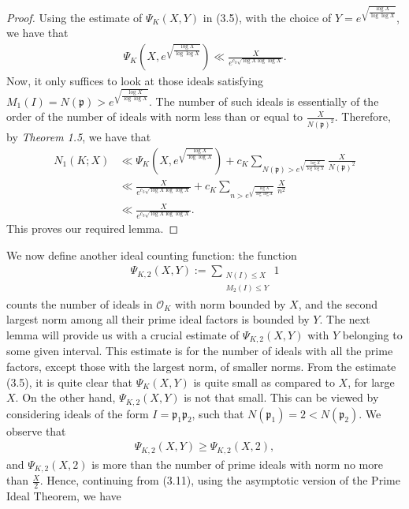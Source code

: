 \documentclass[12pt]{article}
\numberwithin{equation}{section}
\numberwithin{equation}{section}
\begin{document}
\begin{proof}
    Using the estimate of $\Psi_K(X,Y)$ in (3.5), with the choice of $Y = e^{\sqrt{\frac{\log X}{\log\log X}}}$, we have that 
    \begin{align}
        \Psi_K\left(X,e^{\sqrt{\frac{\log X}{\log\log X}}}\right) \ll \frac{X}{e^{c_3\sqrt{\log X\log \log X}}}.
    \end{align}
    Now, it only suffices to look at those ideals satisfying $M_1(I)=N(\mathfrak{p})>e^{\sqrt{\frac{\log X}{\log\log X}}}$. The number of such ideals is essentially of the order of the number of ideals with norm less than or equal to $\frac{X}{N(\mathfrak{p})^2}$. Therefore, by \textit{Theorem 1.5}, we have that 
    \begin{align}
        N_1(K;X) &\ll  \Psi_K\left(X,e^{\sqrt{\frac{\log X}{\log\log X}}}\right) + c_K \sum_{N(\mathfrak{p})>e^{\sqrt{\frac{\log X}{\log\log X}}}}\frac{X}{N(\mathfrak{p})^2} \nonumber \\
        &\ll \frac{X}{e^{c_3\sqrt{\log X\log\log X}}} + c_K\sum_{n>e^{\sqrt{\frac{\log X}{\log\log X}}}} \frac{X}{n^2} \nonumber \\
        &\ll \frac{X}{e^{c_3\sqrt{\log X\log\log X}}}.
    \end{align}
This proves our required lemma.
\end{proof}
\noindent We now define another ideal counting function: the function
\begin{align}
    \Psi_{K,2}(X,Y) := \sum_{\substack{N(I)\leq X \\ M_2(I)\leq Y}} 1 
\end{align}
counts the number of ideals in $\mathcal{O}_K$ with norm bounded by $X$, and the second largest norm among all their prime ideal factors is bounded by $Y$. The next lemma will provide us with a crucial estimate of $\Psi_{K,2}(X,Y)$ with $Y$ belonging to some given interval. This estimate is for the number of ideals with all the prime factors, except those with the largest norm, of smaller norms. From the estimate (3.5), it is quite clear that $\Psi_K(X,Y)$ is quite small as compared to $X$, for large $X$. On the other hand, $\Psi_{K,2}(X,Y)$ is not that small. This can be viewed by considering ideals of the form $I=\mathfrak{p}_1\mathfrak{p}_2$, such that $N(\mathfrak{p}_1)=2<N(\mathfrak{p}_2)$. We observe that 
\begin{align}
    \Psi_{K,2}(X,Y) \geq \Psi_{K,2}(X,2), 
\end{align}
and $\Psi_{K,2}(X,2)$ is more than the number of prime ideals with norm no more than $\frac{X}{2}$. Hence, continuing from (3.11), using the asymptotic version of the Prime Ideal Theorem, we have
\end{document}
